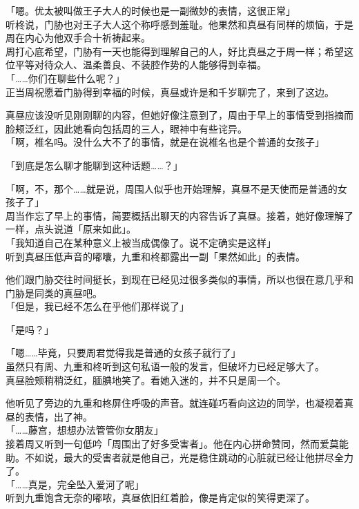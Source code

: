 「嗯。优太被叫做王子大人的时候也是一副微妙的表情，这很正常」\\

听柊说，门胁也对王子大人这个称呼感到羞耻。他果然和真昼有同样的烦恼，于是周在内心为他双手合十祈祷起来。\\

周打心底希望，门胁有一天也能得到理解自己的人，好比真昼之于周一样；希望这位平等对待众人、温柔善良、不装腔作势的人能够得到幸福。\\

「……你们在聊些什么呢？」\\

正当周祝愿着门胁得到幸福的时候，真昼或许是和千岁聊完了，来到了这边。

真昼应该没听见刚刚聊的内容，但她好像注意到了，周由于早上的事情受到指摘而脸颊泛红，因此她看向包括周的三人，眼神中有些诧异。\\

「啊，椎名吗。没什么大不了的事情，就是在说椎名也是个普通的女孩子」

「到底是怎么聊才能聊到这种话题……？」

「啊，不，那个……就是说，周围人似乎也开始理解，真昼不是天使而是普通的女孩子了」\\

周当作忘了早上的事情，简要概括出聊天的内容告诉了真昼。接着，她好像理解了一样，点头说道「原来如此」。\\

「我知道自己在某种意义上被当成偶像了。说不定确实是这样」\\

听到真昼压低声音的嘟囔，九重和柊都露出一副「果然如此」的表情。

他们跟门胁交往时间挺长，到现在已经见过很多类似的事情，所以也很在意几乎和门胁是同类的真昼吧。\\

「但是，我已经不怎么在乎他们那样说了」

「是吗？」

「嗯……毕竟，只要周君觉得我是普通的女孩子就行了」\\

虽然只有周、九重和柊听到这句私语一般的发言，但破坏力已经足够大了。\\

真昼脸颊稍稍泛红，腼腆地笑了。看她入迷的，并不只是周一个。

他听见了旁边的九重和柊屏住呼吸的声音。就连碰巧看向这边的同学，也凝视着真昼的表情，出了神。\\

「……藤宫，想想办法管管你女朋友」\\

接着周又听到一句低吟「周围出了好多受害者」。他在内心拼命赞同，然而爱莫能助。不如说，最大的受害者就是他自己，光是稳住跳动的心脏就已经让他拼尽全力了。\\

「……真是，完全坠入爱河了呢」\\

听到九重饱含无奈的嘟哝，真昼依旧红着脸，像是肯定似的笑得更深了。
